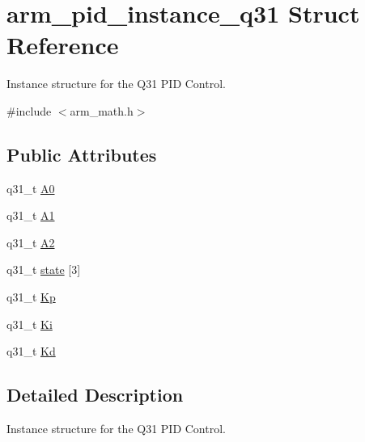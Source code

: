 \hypertarget{structarm__pid__instance__q31}{\section{arm\-\_\-pid\-\_\-instance\-\_\-q31 Struct Reference}
\label{structarm__pid__instance__q31}
}


Instance structure for the Q31 P\-I\-D Control.  




{\ttfamily \#include $<$arm\-\_\-math.\-h$>$}

\subsection*{Public Attributes}
\begin{DoxyCompactItemize}
\item 
q31\-\_\-t \hyperlink{structarm__pid__instance__q31_aa5332635ce9c7078cdb4c1ecf442eadd}{A0}
\item 
q31\-\_\-t \hyperlink{structarm__pid__instance__q31_a2f7492bd6fb92fae5e2de7fbbec39b0e}{A1}
\item 
q31\-\_\-t \hyperlink{structarm__pid__instance__q31_a3e34537c53af4f9ad7bfffa4dff27c82}{A2}
\item 
q31\-\_\-t \hyperlink{structarm__pid__instance__q31_a228e4a64da6014844a0a671a1fa391d4}{state} \mbox{[}3\mbox{]}
\item 
q31\-\_\-t \hyperlink{structarm__pid__instance__q31_ac2410bf7f856d58dc1d773d4983cac8e}{Kp}
\item 
q31\-\_\-t \hyperlink{structarm__pid__instance__q31_aa861d69fd398f29aa0b4b455a823ed72}{Ki}
\item 
q31\-\_\-t \hyperlink{structarm__pid__instance__q31_aab4ff371d14441df501f1169f71cbd17}{Kd}
\end{DoxyCompactItemize}


\subsection{Detailed Description}
Instance structure for the Q31 P\-I\-D Control. 

